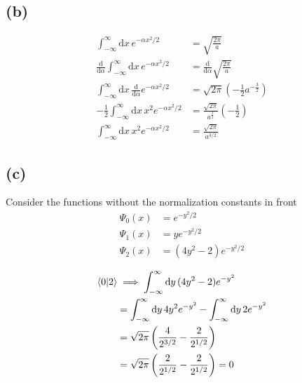 \documentclass[letter, 10pts]{article}
\begin{document}
\subsection*{(b)} 

\begin{align*}
\int_{-\infty}^{\infty} 
\mathrm{d} x \, 
e^{-  \alpha x^2 / 2} 
&= 
\sqrt{\frac{2\pi}{a}} \\
\frac{\mathrm{d} }{\mathrm{d} \alpha }\int_{-\infty}^{\infty} 
\mathrm{d} x \, 
e^{-  \alpha x^2 / 2} 
&= 
\frac{\mathrm{d} }{\mathrm{d} \alpha}
\sqrt{\frac{2\pi}{a}} \\
\int_{-\infty}^{\infty} 
\mathrm{d} x \, 
\frac{\mathrm{d} }{\mathrm{d} \alpha }
e^{-  \alpha x^2 / 2}  
&= 
\sqrt{2 \pi }  \left(
- \frac{1}{2} a^{- \frac{3}{2}}
\right) \\
- \frac{1}{2 } 
\int_{-\infty}^{\infty} 
\mathrm{d} x \, 
x^2 e^{-  \alpha x^2 / 2}  
&= 
\frac{\sqrt{2 \pi } }{a^{\frac{3}{2}}}  \left(
- \frac{1}{2} 
\right)\\
\int_{-\infty}^{\infty} 
\mathrm{d} x \, 
x^2 e^{-  \alpha x^2 / 2}  
&= 
\frac{\sqrt{2 \pi } }{a^{{3}/ {2}}} 
\end{align*}





\subsection*{(c)} 
Consider the functions without the normalization constants in front
\begin{align*}
	\Psi_0(x) &= e^{ - y^2 / 2} \\ 
	\Psi_1(x) &= y e^{ - y^2 / 2} \\
	\Psi_2(x) &= (4 y^2 - 2) e^{ - y^2  / 2} \\
\end{align*}
\begin{align*}
\braket{0 | 2 }
&\implies
\int_{-\infty}^{\infty} \mathrm{d} y \, 
(4 y^2 - 2) e^{ - y^2 } \\
&= \int_{-\infty}^{\infty} \mathrm{d} y \, 
4 y^2 e^{ - y^2 } - 
\int_{-\infty}^{\infty} \mathrm{d} y \, 2 e^{ - y^2 }\\
&= 
\sqrt{2\pi } 
\left(
\frac{4}{2^{3 / 2}} 
- 
\frac{2}{2^{1 / 2}}
\right)
\\
&= 
\sqrt{2\pi } 
\left(
\frac{2}{2^{1 / 2}} 
- 
\frac{2}{2^{1 / 2}}
\right) = 0
\end{align*}
\end{document}
